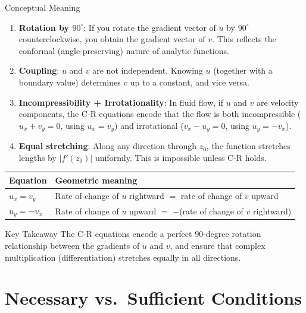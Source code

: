 \documentclass[12pt,a4paper]{article}
\begin{document}
\begin{infobox}{Conceptual Meaning}
\begin{enumerate}[noitemsep]
  \item \textbf{Rotation by $90^\circ$}: If you rotate the gradient vector of $u$ by $90^\circ$ counterclockwise, you obtain the gradient vector of $v$. This reflects the conformal (angle-preserving) nature of analytic functions.
  \item \textbf{Coupling}: $u$ and $v$ are not independent. Knowing $u$ (together with a boundary value) determines $v$ up to a constant, and vice versa.
  \item \textbf{Incompressibility + Irrotationality}: In fluid flow, if $u$ and $v$ are velocity components, the C-R equations encode that the flow is both incompressible ($u_x + v_y = 0$, using $u_x = v_y$) and irrotational ($v_x - u_y = 0$, using $u_y = -v_x$).
  \item \textbf{Equal stretching}: Along any direction through $z_0$, the function stretches lengths by $|f'(z_0)|$ uniformly. This is impossible unless C-R holds.
\end{enumerate}
\end{infobox}

\medskip

\begin{center}
\begin{tabular}{ll}
\toprule
\textbf{Equation} & \textbf{Geometric meaning} \\
\midrule
$u_x = v_y$ & Rate of change of $u$ rightward $=$ rate of change of $v$ upward \\
$u_y = -v_x$ & Rate of change of $u$ upward $=$ $-$(rate of change of $v$ rightward) \\
\bottomrule
\end{tabular}
\end{center}

\begin{learnbox}{Key Takeaway}
The C-R equations encode a perfect 90-degree rotation relationship between the gradients of $u$ and $v$, and ensure that complex multiplication (differentiation) stretches equally in all directions.
\end{learnbox}

\section{Necessary vs.\ Sufficient Conditions}
\end{document}
